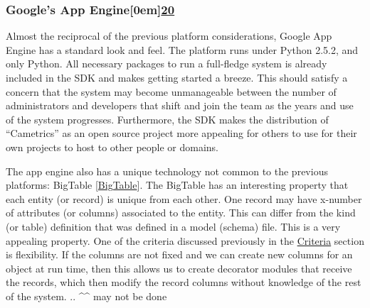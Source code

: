 \documentclass[10pt,a4paper,english]{article}
\begin{document}

\hypertarget{google-s-app-engine}{}
\subsubsection*{Google's App Engine\raisebox{.5em}[0em]{\scriptsize\hyperlink{id41}{20}}}
\label{google-s-app-engine}

Almost the reciprocal of the previous platform considerations, Google App Engine has a standard look and feel. The platform runs under Python 2.5.2, and only Python. All necessary packages to run a full-fledge system is already included in the SDK and makes getting started a breeze. This should satisfy a concern that the system may become unmanageable between the number of administrators and developers that shift and join the team as the years and use of the system progresses. Furthermore, the SDK makes the distribution of ``Cametrics'' as an open source project more appealing for others to use for their own projects to host to other people or domains.

The app engine also has a unique technology not common to the previous platforms: BigTable [\hyperlink{bigtable}{BigTable}]. The BigTable has an interesting property that each entity (or record) is unique from each other. One record may have x-number of attributes (or columns) associated to the entity. This can differ from the kind (or table) definition that was defined in a model (schema) file. This is a very appealing property. One of the criteria discussed previously in the \href{\#criteria}{Criteria} section is flexibility. If the columns are not fixed and we can create new columns for an object at run time, then this allows us to create decorator modules that receive the records, which then modify the record columns without knowledge of the rest of the system.
.. {\textasciicircum}{\textasciicircum} may not be done
\end{document}
